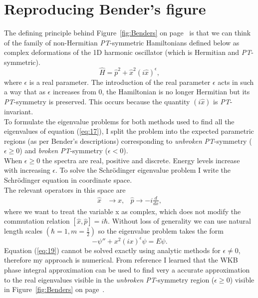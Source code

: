\documentclass[10pt, a4paper, singlespacing, headsepline]{report}
\newcommand\PT{\emph{PT}}
\begin{document}
\chapter{Reproducing Bender's figure}\label{Benders}
The defining principle behind Figure~\ref{fig:Benders} on page~\pageref{fig:Benders} is that we can think of the family of non-Hermitian \PT-symmetric Hamiltonians defined below as complex deformations of the 1D harmonic oscillator (which is Hermitian and \PT-symmetric).
\begin{equation}\label{eq:17}
\hat{H} = \hat{p}^2 + \hat{x}^2 (i \hat{x})^{\epsilon},
\end{equation}
where $\epsilon$ is a real parameter. The introduction of the real parameter $\epsilon$ acts in such a way that as $\epsilon$ increases from $0$, the Hamiltonian is no longer Hermitian but its \PT-symmetry is preserved. This occurs because the quantity $(i\hat{x})$ is \PT-invariant\cite{BenderPT}\cite{Bender}.\\ 
To formulate the eigenvalue problems for both methods used to find all the eigenvalues of equation (\ref{eq:17}), I split the problem into the expected parametric regions (as per Bender's descriptions) corresponding to \emph{unbroken} \PT-symmetry ($\epsilon \geq 0$) and \emph{broken} \PT-symmetry ($\epsilon < 0$).\\
When $\epsilon \geq 0$ the spectra are real, positive and discrete. Energy levels increase with increasing $\epsilon$.
To solve the Schrödinger eigenvalue problem I write the Schrödinger equation in coordinate space.\\ The relevant operators in this space are
\begin{align} \label{eq:18}
\hat{x}& \rightarrow x,  &\hat{p}\rightarrow -i \frac{d}{dx},
\end{align}
where we want to treat the variable x as complex, which does not modify the commutation relation $[\hat{x}, \hat{p}] = i\hbar$. Without loss of generality we can use natural length scales $(\hbar = 1, m = \frac{1}{2})$ so the eigenvalue problem takes the form
\begin{equation}\label{eq:19}
-\psi'' + x^2 (i x)^{\epsilon} \psi = E \psi.
\end{equation}
Equation (\ref{eq:19}) cannot be solved exactly using analytic methods for $\epsilon \neq 0$, therefore my approach is numerical. From reference \cite{Bender} I learned that the WKB phase integral approximation can be used to find very a accurate approximation to the real eigenvalues visible in the \emph{unbroken} \PT-symmetry region ($\epsilon \geq 0$) visible in Figure~\ref{fig:Benders} on page~\pageref{fig:Benders}. 
\end{document}
